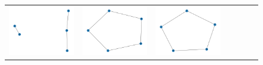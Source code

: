 \documentclass[11pt,a4paper,openright,oneside]{book}
\numberwithin{equation}{section}
\begin{document}
{\begin{figure}[H]
\begin{adjustwidth}{-3cm}{-3cm}
\begin{tabular}{>{\centering\arraybackslash}m{1.5cm}| m{2.5cm} |m{2.5cm} |m{2.5cm} |m{2.5cm} |m{2.5cm} |m{2.5cm}}
        \includegraphics[width=\linewidth]{media/nn/graph-0.5-tnale-0.5-RR2.png} &
        \includegraphics[width=\linewidth]{media/nn/graph-0.75-tnale-0.75-RR2.png} &
        \includegraphics[width=\linewidth]{media/nn/graph-1-tnale-1-RR2.png} &

\end{tabular}
\end{adjustwidth}
\end{figure}}
\end{document}
